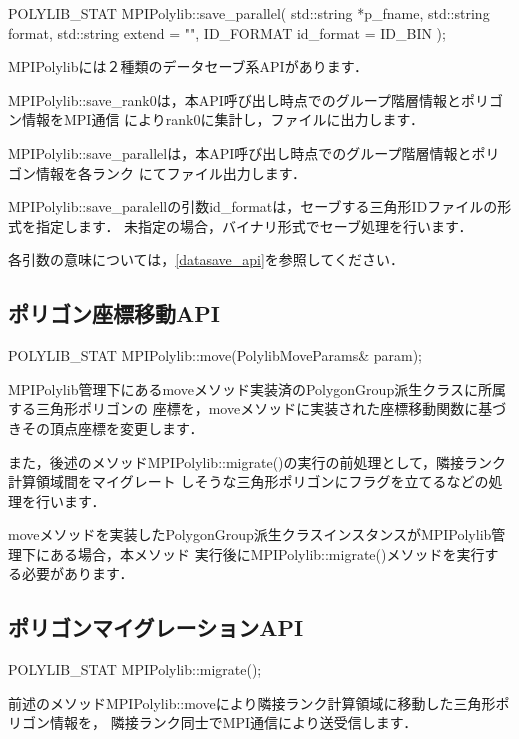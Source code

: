{\begin{program}
	POLYLIB_STAT MPIPolylib::save_parallel(
		std::string	*p_fname,
		std::string	format,
		std::string	extend = "",
		ID_FORMAT   id_format = ID_BIN
	);
\end{program}

MPIPolylibには２種類のデータセーブ系APIがあります．

MPIPolylib::save\_rank0は，本API呼び出し時点でのグループ階層情報とポリゴン情報をMPI通信
によりrank0に集計し，ファイルに出力します．

MPIPolylib::save\_parallelは，本API呼び出し時点でのグループ階層情報とポリゴン情報を各ランク
にてファイル出力します．

MPIPolylib::save\_paralellの引数id\_formatは，セーブする三角形IDファイルの形式を指定します．
未指定の場合，バイナリ形式でセーブ処理を行います．

各引数の意味については，\ref{datasave_api}を参照してください．

%
\subsection{ポリゴン座標移動API}

\begin{program}
	POLYLIB_STAT MPIPolylib::move(PolylibMoveParams& param);
\end{program}

MPIPolylib管理下にあるmoveメソッド実装済のPolygonGroup派生クラスに所属する三角形ポリゴンの
座標を，moveメソッドに実装された座標移動関数に基づきその頂点座標を変更します．

また，後述のメソッドMPIPolylib::migrate()の実行の前処理として，隣接ランク計算領域間をマイグレート
しそうな三角形ポリゴンにフラグを立てるなどの処理を行います．

moveメソッドを実装したPolygonGroup派生クラスインスタンスがMPIPolylib管理下にある場合，本メソッド
実行後にMPIPolylib::migrate()メソッドを実行する必要があります．

%
\subsection{ポリゴンマイグレーションAPI}

\begin{program}
	POLYLIB_STAT MPIPolylib::migrate();
\end{program}

前述のメソッドMPIPolylib::moveにより隣接ランク計算領域に移動した三角形ポリゴン情報を，
隣接ランク同士でMPI通信により送受信します．

}
